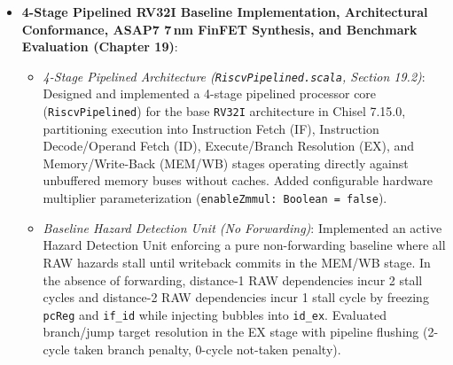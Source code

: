 \begin{itemize}
\begin{itemize}
        (3) \textbf{Brent-Kung Parallel Prefix Adder (BKA)}: 144 cells, $14.83\,\mu\text{m}^2$, $836.25\,\text{ps}$ ($0.836\,\text{ns}$), $1.20\,\text{GHz}$ ($1.25\times$ speedup).
        (4) \textbf{Kogge-Stone Parallel Prefix Adder (KSA)}: 190 cells, $17.48\,\mu\text{m}^2$, $712.57\,\text{ps}$ ($0.713\,\text{ns}$), $1.40\,\text{GHz}$ ($1.47\times$ speedup).
        (5) \textbf{Carry-Select Adder (CSelA)}: 190 cells, $18.01\,\mu\text{m}^2$, \textbf{519.83\,ps (0.520\,ns)}, \textbf{1.92\,GHz} (\textbf{2.01$\times$ speedup}).
        \item \textit{Selection of Optimal Adder and Pipeline Balancing (Section 19.4)}: Selected the Carry-Select Adder as the optimal high-speed adder, cutting addition delay in half ($0.520\,\text{ns}$). Provided concise Chisel code illustrating only the adder invocation. Demonstrated that replacing the RCA balances the pipeline ($T_{\text{fetch}} = 0.550\,\text{ns}$, $T_{\text{decode}} = 0.540\,\text{ns}$, $T_{\text{execute}} \approx 0.600\,\text{ns}$, $T_{\text{sram\_wb}} = 0.600\,\text{ns}$), dropping the worst-case clock period to $0.600\,\text{ns}$ and unlocking an operating frequency of \textbf{1.67\,GHz} ($+127.2\%$ frequency boost, $2.27\times$ over the unoptimized pipeline).
    \end{itemize}
    \item \textbf{4-Stage Pipelined RV32I Baseline Implementation, Architectural Conformance, ASAP7 7\,nm FinFET Synthesis, and Benchmark Evaluation (Chapter 19)}:
    \begin{itemize}
        \item \textit{4-Stage Pipelined Architecture (\texttt{RiscvPipelined.scala}, Section 19.2)}: Designed and implemented a 4-stage pipelined processor core (\texttt{RiscvPipelined}) for the base \texttt{RV32I} architecture in Chisel 7.15.0, partitioning execution into Instruction Fetch (IF), Instruction Decode/Operand Fetch (ID), Execute/Branch Resolution (EX), and Memory/Write-Back (MEM/WB) stages operating directly against unbuffered memory buses without caches. Added configurable hardware multiplier parameterization (\texttt{enableZmmul: Boolean = false}).
        \item \textit{Baseline Hazard Detection Unit (No Forwarding)}: Implemented an active Hazard Detection Unit enforcing a pure non-forwarding baseline where all RAW hazards stall until writeback commits in the MEM/WB stage. In the absence of forwarding, distance-1 RAW dependencies incur 2 stall cycles and distance-2 RAW dependencies incur 1 stall cycle by freezing \texttt{pcReg} and \texttt{if\_id} while injecting bubbles into \texttt{id\_ex}. Evaluated branch/jump target resolution in the EX stage with pipeline flushing (2-cycle taken branch penalty, 0-cycle not-taken penalty).

\end{itemize}
\end{itemize}
